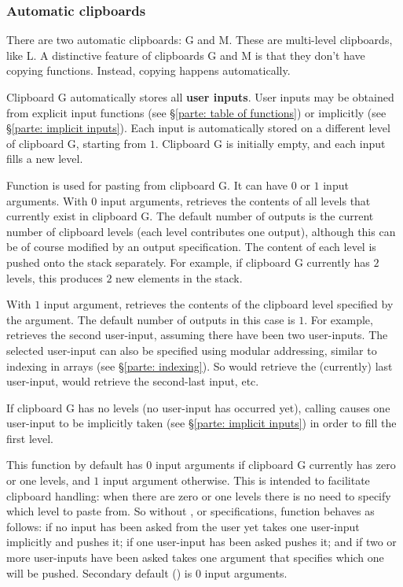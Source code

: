 \documentclass[12pt]{article}
\newcommand{\parte}{\textbf}
\newcommand{\matl}[1]{{\ttfamily\color{fgmatl}{\hl{#1}}}} %
\begin{document}
\subsubsection{Automatic clipboards}
\label{parte: automatic clipboards}

There are two automatic clipboards: G and M. These are multi-level clipboards, like L. A distinctive feature of clipboards G and M is that they don't have copying functions. Instead, copying happens automatically.

Clipboard G automatically stores all \parte{user inputs}. User inputs may be obtained from explicit input functions (see \S\ref{parte: table of functions}) or implicitly (see \S\ref{parte: implicit inputs}). Each input is automatically stored on a different level of clipboard G, starting from $1$. Clipboard G is initially empty, and each input fills a new level.

Function \matl{G} is used for pasting from clipboard G. It can have $0$ or $1$ input arguments. With $0$ input arguments, \matl{G} retrieves the contents of all levels that currently exist in clipboard G. The default number of outputs is the current number of clipboard levels (each level contributes one output), although this can be of course modified by an output specification. The content of each level is pushed onto the stack separately. For example, if clipboard G currently has $2$ levels, this produces $2$ new elements in the stack.

With $1$ input argument, \matl{G} retrieves the contents of the clipboard level specified by the argument. The default number of outputs in this case is $1$. For example, \matl{2G} retrieves the second user-input, assuming there have been two user-inputs. The selected user-input can also be specified using modular addressing, similar to indexing in arrays (see \S\ref{parte: indexing}). So \matl{0G} would retrieve the (currently) last user-input, \matl{-1G} would retrieve the second-last input, etc.

If clipboard G has no levels (no user-input has occurred yet), calling \matl{G} causes one user-input to be implicitly taken (see \S\ref{parte: implicit inputs}) in order to fill the first level.

This function by default has $0$ input arguments if clipboard G currently has zero or one levels, and $1$ input argument otherwise. This is intended to facilitate clipboard handling: when there are zero or one levels there is no need to specify which level to paste from. So without \matl{\$}, \matl{\#} or \matl{\&} specifications, function \matl{G} behaves as follows: if no input has been asked from the user yet \matl{G} takes one user-input implicitly and pushes it; if one user-input has been asked \matl{G} pushes it; and if two or more user-inputs have been asked \matl{G} takes one argument that specifies which one will be pushed. Secondary default (\matl{\&}) is $0$ input arguments.
\end{document}
